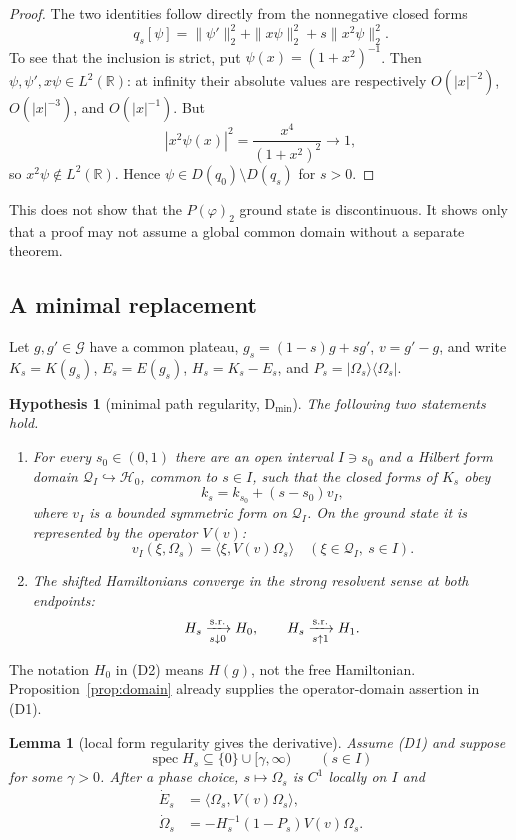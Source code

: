 \documentclass[11pt,a4paper]{article}
\newtheorem{lemma}[theorem]{Lemma}
\newtheorem{hypothesis}[theorem]{Hypothesis}
\theoremstyle{remark}
\newcommand{\R}{\mathbb R}
\newcommand{\Hh}{\mathcal H_0}
\newcommand{\Om}{\Omega}
\newcommand{\G}{\mathcal G}
\newcommand{\Q}{\mathcal Q}
\DeclareMathOperator{\spec}{spec}
\begin{document}
\begin{proof}
The two identities follow directly from the nonnegative closed forms
\[
 q_s[\psi]=\|\psi'\|_2^2+\|x\psi\|_2^2+s\|x^2\psi\|_2^2.
\]
To see that the inclusion is strict, put $\psi(x)=(1+x^2)^{-1}$.  Then
$\psi,\psi',x\psi\in L^2(\R)$: at infinity their absolute values are respectively
$O(|x|^{-2})$, $O(|x|^{-3})$, and $O(|x|^{-1})$.  But
\[
 |x^2\psi(x)|^2=\frac{x^4}{(1+x^2)^2}\longrightarrow1,
\]
so $x^2\psi\notin L^2(\R)$.  Hence $\psi\in D(q_0)\setminus D(q_s)$ for $s>0$.
\end{proof}

This does not show that the $P(\varphi)_2$ ground state is discontinuous.  It shows only that a
proof may not assume a global common domain without a separate theorem.

\subsection{A minimal replacement}

Let $g,g'\in\G$ have a common plateau, $g_s=(1-s)g+sg'$, $v=g'-g$, and write
$K_s=K(g_s)$, $E_s=E(g_s)$, $H_s=K_s-E_s$, and
$P_s=|\Om_s\rangle\langle\Om_s|$.

\begin{hypothesis}[minimal path regularity, D$_\mathrm{min}$]\label{hyp:Dmin}
The following two statements hold.
\begin{enumerate}
\item[(D1)] For every $s_0\in(0,1)$ there are an open interval $I\ni s_0$ and a Hilbert form
domain $\Q_I\hookrightarrow\Hh$, common to $s\in I$, such that the closed forms of $K_s$ obey
\[
 k_s=k_{s_0}+(s-s_0)v_I,
\]
where $v_I$ is a bounded symmetric form on $\Q_I$.  On the ground state it is represented by the
operator $V(v)$:
\[
 v_I(\xi,\Om_s)=\langle\xi,V(v)\Om_s\rangle
 \quad(\xi\in\Q_I,\ s\in I).
\]
\item[(D2)] The shifted Hamiltonians converge in the strong resolvent sense at both endpoints:
\[
 H_s\xrightarrow[s\downarrow0]{\rm s.r.}H_0,
 \qquad H_s\xrightarrow[s\uparrow1]{\rm s.r.}H_1.
\]
\end{enumerate}
\end{hypothesis}

The notation $H_0$ in (D2) means $H(g)$, not the free Hamiltonian.  Proposition~\ref{prop:domain}
already supplies the operator-domain assertion in (D1).

\begin{lemma}[local form regularity gives the derivative]\label{lem:localderivative}
Assume (D1) and suppose
\[
 \spec H_s\subseteq\{0\}\cup[\gamma,\infty)
 \qquad(s\in I)
\]
for some $\gamma>0$.  After a phase choice, $s\mapsto\Om_s$ is $C^1$ locally on $I$ and
\begin{align}
 \dot E_s&=\langle\Om_s,V(v)\Om_s\rangle,\label{eq:HF}\tag{4.1}\\
 \dot\Om_s&=-H_s^{-1}(1-P_s)V(v)\Om_s.\label{eq:vector}\tag{4.2}
\end{align}
\end{lemma}
\end{document}
